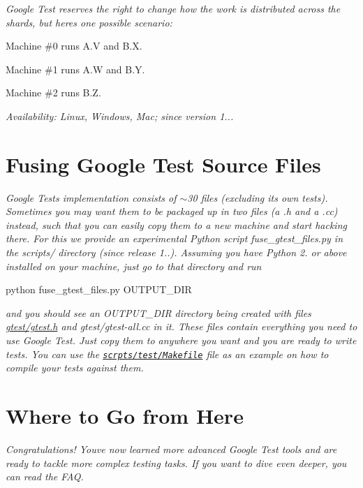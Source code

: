 {\itshape Google Test reserves the right to change how the work is distributed across the shards, but here\textquotesingle{}s one possible scenario\+:}

{\itshape 
\begin{DoxyItemize}
\item Machine \#0 runs {\ttfamily A.\+V} and {\ttfamily B.\+X}.
\item Machine \#1 runs {\ttfamily A.\+W} and {\ttfamily B.\+Y}.
\item Machine \#2 runs {\ttfamily B.\+Z}.
\end{DoxyItemize}}

{\itshape {\itshape Availability\+:} Linux, Windows, Mac; since version 1...}

{\itshape \section*{Fusing Google Test Source Files}}

{\itshape }

{\itshape Google Test\textquotesingle{}s implementation consists of $\sim$30 files (excluding its own tests). Sometimes you may want them to be packaged up in two files (a {\ttfamily .h} and a {\ttfamily .cc}) instead, such that you can easily copy them to a new machine and start hacking there. For this we provide an experimental Python script {\ttfamily fuse\+\_\+gtest\+\_\+files.\+py} in the {\ttfamily scripts/} directory (since release 1..). Assuming you have Python 2. or above installed on your machine, just go to that directory and run 
\begin{DoxyCode}
python fuse\_gtest\_files.py OUTPUT\_DIR
\end{DoxyCode}
}

{\itshape and you should see an {\ttfamily O\+U\+T\+P\+U\+T\+\_\+\+D\+IR} directory being created with files {\ttfamily \hyperlink{gtest_8h_source}{gtest/gtest.\+h}} and {\ttfamily gtest/gtest-\/all.\+cc} in it. These files contain everything you need to use Google Test. Just copy them to anywhere you want and you are ready to write tests. You can use the \href{../scripts/test/Makefile}{\tt scrpts/test/\+Makefile} file as an example on how to compile your tests against them.}

{\itshape \section*{Where to Go from Here}}

{\itshape }

{\itshape Congratulations! You\textquotesingle{}ve now learned more advanced Google Test tools and are ready to tackle more complex testing tasks. If you want to dive even deeper, you can read the F\+AQ. }